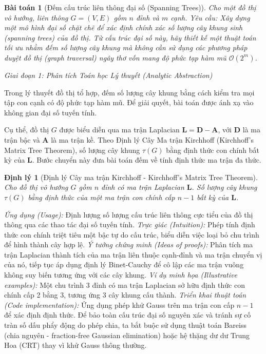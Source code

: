 \documentclass{article}
\newtheorem{baitoan}{Bài toán}
\newtheorem{dinhly}{Định lý}
\begin{document}
\begin{baitoan}[Đếm cấu trúc liên thông đại số (Spanning Trees)]
Cho một đồ thị vô hướng, liên thông $G = (V, E)$ gồm $n$ đỉnh và $m$ cạnh. Yêu cầu: Xây dựng một mô hình đại số chặt chẽ để xác định chính xác số lượng cây khung sinh (spanning trees) của đồ thị. Từ cấu trúc đại số này, hãy thiết kế một thuật toán tối ưu nhằm đếm số lượng cây khung mà không cần sử dụng các phương pháp duyệt đồ thị (graph traversal) ngây thơ vốn mang độ phức tạp hàm mũ $\mathcal{O}(2^m)$.
\end{baitoan}

\vspace{0.5em}\noindent\emph{Giai đoạn 1: Phân tích Toán học Lý thuyết (Analytic Abstraction)}

Trong lý thuyết đồ thị tổ hợp, đếm số lượng cây khung bằng cách kiểm tra mọi tập con cạnh có độ phức tạp hàm mũ. Để giải quyết, bài toán được ánh xạ vào không gian đại số tuyến tính.

Cụ thể, đồ thị $G$ được biểu diễn qua ma trận Laplacian $\mathbf{L} = \mathbf{D} - \mathbf{A}$, với $\mathbf{D}$ là ma trận bậc và $\mathbf{A}$ là ma trận kề. Theo Định lý Cây Ma trận Kirchhoff (Kirchhoff's Matrix Tree Theorem), số lượng cây khung $\tau(G)$ bằng định thức con chính bất kỳ của $\mathbf{L}$. Bước chuyển này đưa bài toán đếm về tính định thức ma trận đa thức.

\begin{dinhly}[Định lý Cây ma trận Kirchhoff - Kirchhoff's Matrix Tree Theorem]
Cho đồ thị vô hướng $G$ gồm $n$ đỉnh có ma trận Laplacian $\mathbf{L}$. Số lượng cây khung $\tau(G)$ bằng định thức của một ma trận con chính cấp $n-1$ bất kỳ của $\mathbf{L}$.
\end{dinhly}
\emph{Ứng dụng (Usage):} Định lượng số lượng cấu trúc liên thông cực tiểu của đồ thị thông qua các thao tác đại số tuyến tính.
\emph{Trực giác (Intuition):} Phép tính định thức con chính triệt tiêu một bậc tự do cấu trúc, biểu diễn việc loại bỏ chu trình để hình thành cây hợp lệ.
\emph{Ý tưởng chứng minh (Ideas of proofs):} Phân tích ma trận Laplacian thành tích của ma trận liên thuộc cạnh-đỉnh và ma trận chuyển vị của nó, tiếp tục áp dụng định lý Binet-Cauchy để cô lập các ma trận vuông không suy biến tương ứng với các cây khung.
\emph{Ví dụ minh họa (Illustrative examples):} Một chu trình 3 đỉnh có ma trận Laplacian sở hữu định thức con chính cấp 2 bằng 3, tương ứng 3 cây khung cấu thành.
\emph{Triển khai thuật toán (Code implementation):} Ứng dụng phép khử Gauss trên ma trận con cấp $n-1$ để xác định định thức. Để bảo toàn cấu trúc đại số nguyên xác và tránh sự cố tràn số dấu phẩy động do phép chia, ta bắt buộc sử dụng thuật toán Bareiss (chia nguyên - fraction-free Gaussian elimination) hoặc hệ thặng dư dư Trung Hoa (CRT) thay vì khử Gauss thông thường.
\end{document}
